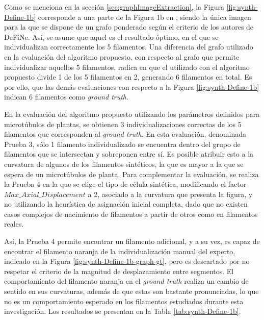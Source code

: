 
Como se menciona en la secci\'on \ref{sec:graphImageExtraction}, la Figura \ref{fig:synth-Define-1b} corresponde a una parte de la Figura 1b en \cite{breuer2015define}, siendo la \'unica imagen para la que se dispone de un grafo ponderado seg\'un el criterio de los autores de DeFiNe. As\'i, se asume que aquel es el resultado \'optimo, en el que se individualizan correctamente los 5 filamentos. Una diferencia del grafo utilizado en la evaluaci\'on del algoritmo propuesto, con respecto al grafo que permite individualizar aquellos 5 filamentos, radica en que el utilizado con el algoritmo propuesto divide 1 de los 5 filamentos en 2, generando 6 filamentos en total. Es por ello, que las dem\'as evaluaciones con respecto a la Figura \ref{fig:synth-Define-1b} indican 6 filamentos como {\it ground truth}.


En la evaluaci\'on del algoritmo propuesto utilizando los par\'ametros definidos para microt\'ubulos de plantas, se obtienen 3 individualizaciones correctas de los 5 filamentos que corresponden al {\it ground truth}. En esta evaluaci\'on, denominada Prueba 3, s\'olo 1 filamento individualizado se encuentra dentro del grupo de filamentos que se intersectan y sobreponen entre s\'i. Es posible atribuir esto a la curvatura de algunos de los filamentos sint\'eticos, la que es mayor a la que se espera de un microt\'ubulos de planta. Para complementar la evaluaci\'on, se realiza la Prueba 4 en la que se elige el tipo de c\'elula sint\'etica, modificando el factor $Max\_Axial\_Displacement$ a 2, asociado a la curvatura que presenta la figura, y no utilizando la heur\'istica de asignaci\'on inicial completa, dado que no existen casos complejos de nacimiento de filamentos a partir de otros como en filamentos reales.

As\'i, la Prueba 4 permite encontrar un filamento adicional, y a su vez, es capaz de encontrar el filamento naranja de la individualizaci\'on manual del experto, indicado en la Figura \ref{fig:synth-Define-1b-graph-gt}, pero es descartado por no respetar el criterio de la magnitud de desplazamiento entre segmentos. El comportamiento del filamento naranja en el {\it ground truth} realiza un cambio de sentido en sus curvaturas, adem\'as de que estas son bastante pronunciadas, lo que no es un comportamiento esperado en los filamentos estudiados durante esta investigaci\'on. Los resultados se presentan en la Tabla \ref{tab:synth-Define-1b}.




